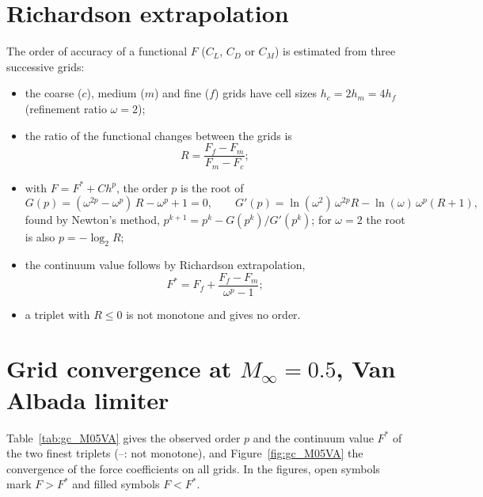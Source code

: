 \documentclass[12pt,a4paper]{article}
\begin{document}
\clearpage
\section{Richardson extrapolation}\label{app:richardson}

The order of accuracy of a functional $F$ ($C_L$, $C_D$ or $C_M$) is estimated from three
successive grids:
\begin{itemize}
  \item the coarse ($c$), medium ($m$) and fine ($f$) grids have cell sizes $h_c=2h_m=4h_f$
  (refinement ratio $\omega=2$);
  \item the ratio of the functional changes between the grids is
  \begin{equation}
    R=\frac{F_f-F_m}{F_m-F_c};
    \label{eq:richardson_R}
  \end{equation}
  \item with $F=F^*+Ch^p$, the order $p$ is the root of
  \begin{equation}
    G(p)=(\omega^{2p}-\omega^p)\,R-\omega^p+1=0,
    \qquad
    G'(p)=\ln(\omega^2)\,\omega^{2p}R-\ln(\omega)\,\omega^p(R+1),
    \label{eq:richardson_G}
  \end{equation}
  found by Newton's method, $p^{k+1}=p^k-G(p^k)/G'(p^k)$; for $\omega=2$ the root is also
  $p=-\log_2R$;
  \item the continuum value follows by Richardson extrapolation,
  \begin{equation}
    F^*=F_f+\frac{F_f-F_m}{\omega^p-1};
    \label{eq:richardson_F}
  \end{equation}
  \item a triplet with $R\le0$ is not monotone and gives no order.
\end{itemize}

\clearpage
\section{Grid convergence at \texorpdfstring{$M_\infty=0.5$}{M = 0.5}, Van Albada limiter}\label{app:gc_M05VA}

Table~\ref{tab:gc_M05VA} gives the observed order $p$ and the continuum value $F^*$ of the two finest
triplets (--: not monotone), and Figure~\ref{fig:gc_M05VA} the
convergence of the force coefficients on all grids. In the figures, open symbols mark $F>F^*$
and filled symbols $F<F^*$.
\end{document}
